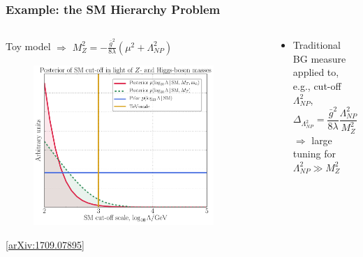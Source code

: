 \documentclass[10pt,aspectratio=169]{beamer}
\begin{document}
\begin{frame}
  \frametitle{Example: the SM Hierarchy Problem}
  \begin{columns}[t]
    \begin{column}{0.5\textwidth}
      \vspace{-15pt}
      \begin{center}
        Toy model $\Rightarrow$ $M_Z^2 = -\frac{\bar{g}^2}{8 \lambda} (\mu^2
        + \Lambda_{NP}^2)$
      \end{center}
      \vspace{-10pt}
      \begin{figure}
        \includegraphics[width=0.9\textwidth]{SM_Lambda}
      \end{figure}
      \vspace{-20pt}
      \begin{center}
        \tiny
        [\href{http://arxiv.org/abs/1709.07895}{arXiv:1709.07895}]
      \end{center}
    \end{column}
    \begin{column}{0.5\textwidth}
      \begin{itemize} \itemsep1em
      \item Traditional BG measure applied to, e.g., cut-off $\Lambda_{NP}^2$,
        \begin{equation*}
          \Delta_{\Lambda_{NP}^2} = \frac{\bar{g}^2}{8 \lambda}
          \frac{\Lambda_{NP}^2}{M_Z^2}
        \end{equation*}
        $\Rightarrow$ large tuning for $\Lambda_{NP}^2 \gg M_Z^2$

\end{itemize}
\end{column}
\end{columns}
\end{frame}
\end{document}
